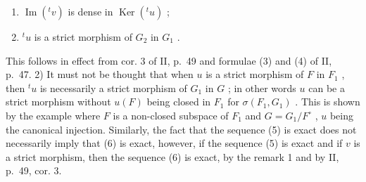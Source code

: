 \begin{enumerate}
\def\labelenumi{\alph{enumi})}
\setcounter{enumi}{1}
\item
  \(\operatorname{Im}(^{t}v)\) is dense in \(\operatorname{Ker}(^{t}u)\) ;
\item
  \(^t u\) is a strict morphism of \(G_2\) in \(G_1\) .
\end{enumerate}

This follows in effect from cor. 3 of II, p.~49 and formulae (3) and (4) of II, p.~47. 2) It must not be thought that when \(u\) is a strict morphism of \(F\) in \(F_1\) , then \(^t u\) is necessarily a strict morphism of \(G_1\) in \(G\) ; in other words \(u\) can be a strict morphism without \(u(F)\) being closed in \(F_1\) for \(\sigma(F_1, G_1)\) . This is shown by the example where \(F\) is a non-closed subspace of \(F_1\) and \(G = G_1 / F^\circ\) , \(u\) being the canonical injection. Similarly, the fact that the sequence (5) is exact does not necessarily imply that (6) is exact, however, if the sequence (5) is exact and if \(v\) is a strict morphism, then the sequence (6) is exact, by the remark 1 and by II, p.~49, cor. 3.

